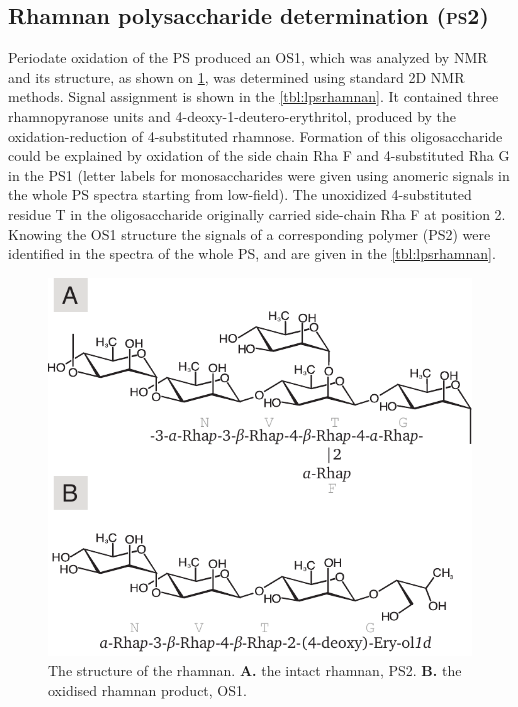 	\subsection{Rhamnan polysaccharide determination (\textsc{ps}2)} %
	\label{sub:rhamnan_polysaccharide_determination_ps2_}

  Periodate oxidation of the \ac{PS} produced an \ac{OS}1, which was analyzed by \ac{NMR} and its
  structure, as shown on \cref{fig:lpsrhamnan}, was determined using standard 2D \ac{NMR}
  methods. Signal assignment is shown in the \cref{tbl:lpsrhamnan}. It contained three
  rhamnopyranose units and 4-deoxy-1-deutero-erythritol, produced by the oxidation-reduction of
  4-substituted rhamnose. Formation of this oligosaccharide could be explained by oxidation of the
  side chain Rha F and 4-substituted Rha G in the \ac{PS}1 (letter labels for monosaccharides were
  given using anomeric signals in the whole \ac{PS} spectra starting from low-field). The unoxidized
  4-substituted residue T in the oligosaccharide originally carried side-chain Rha F at position
  2. Knowing the \ac{OS}1 structure the signals of a corresponding polymer (\ac{PS}2) were
  identified in the spectra of the whole \ac{PS}, and are given in the \cref{tbl:lpsrhamnan}.

		\begin{figure}[htb]
			\begin{center}
				\includegraphics[]{lps_chapter/img/lpsrhamnan.pdf}
			\end{center}
			\caption[The structure of the \caulobacter rhamnan.]{The structure of the \caulobacter rhamnan. \textbf{A.} the intact rhamnan, \ac{PS}2. \textbf{B.} the oxidised rhamnan product, \ac{OS}1.}
			\label{fig:lpsrhamnan}
		\end{figure}

